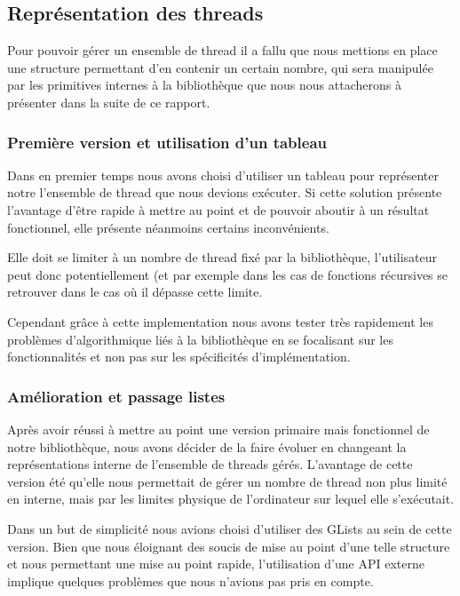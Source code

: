 \documentclass{article}
\begin{document}
		\subsection{Représentation des threads}
		Pour pouvoir gérer un ensemble de thread il a fallu que nous
        mettions en place une structure permettant d'en contenir un
        certain nombre, qui sera manipulée par les primitives internes
        à la bibliothèque que nous nous attacherons à présenter dans
        la suite de ce rapport.

			\subsubsection{Première version et utilisation d'un tableau}
			Dans en premier temps nous avons choisi d'utiliser un
            tableau pour représenter notre l'ensemble de thread que
            nous devions exécuter.  Si cette solution présente
            l'avantage d'être rapide à mettre au point et de pouvoir
            aboutir à un résultat fonctionnel, elle présente néanmoins
            certains inconvénients.
			
			Elle doit se limiter à un nombre de thread fixé par la
            bibliothèque, l'utilisateur peut donc potentiellement (et
            par exemple dans les cas de fonctions récursives se
            retrouver dans le cas où il dépasse cette limite.
			
			Cependant grâce à cette implementation nous avons tester
            très rapidement les problèmes d'algorithmique liés à la
            bibliothèque en se focalisant sur les fonctionnalités et
            non pas sur les spécificités d'implémentation.

			\subsubsection{Amélioration et passage listes}
			Après avoir réussi à mettre au point une version primaire
            mais fonctionnel de notre bibliothèque, nous avons décider
            de la faire évoluer en changeant la représentations
            interne de l'ensemble de threads gérés.  L'avantage de
            cette version été qu'elle nous permettait de gérer un
            nombre de thread non plus limité en interne, mais par les
            limites physique de l'ordinateur sur lequel elle
            s'exécutait.
			
			Dans un but de simplicité nous avions choisi d'utiliser
            des GLists au sein de cette version. Bien que nous
            éloignant des soucis de mise au point d'une telle
            structure et nous permettant une mise au point rapide,
            l'utilisation d'une API externe implique quelques
            problèmes que nous n'avions pas pris en compte.
			
\end{document}
